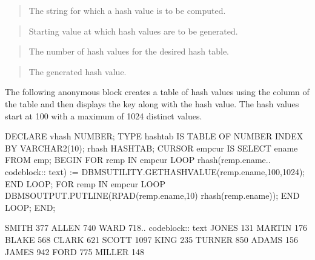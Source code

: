 \documentclass[letterpaper,10pt,english,openany,oneside]{sphinxmanual}
\begin{document}

\begin{quote}

The string for which a hash value is to be computed.
\end{quote}

\begin{quote}

Starting value at which hash values are to be generated.
\end{quote}

\begin{quote}

The number of hash values for the desired hash table.
\end{quote}

\begin{quote}

The generated hash value.
\end{quote}


The following anonymous block creates a table of hash values using the
 column of the  table and then displays the key along with the
hash value. The hash values start at 100 with a maximum of 1024 distinct
values.

%
\begin{sphinxVerbatim}[commandchars=\\\{\}]
DECLARE
    v\PYGZus{}hash          NUMBER;
    TYPE hash\PYGZus{}tab IS TABLE OF NUMBER INDEX BY VARCHAR2(10);
    r\PYGZus{}hash          HASH\PYGZus{}TAB;
    CURSOR emp\PYGZus{}cur IS SELECT ename FROM emp;
BEGIN
    FOR r\PYGZus{}emp IN emp\PYGZus{}cur LOOP
        r\PYGZus{}hash(r\PYGZus{}emp.ename.. code\PYGZhy{}block:: text) :=
            DBMS\PYGZus{}UTILITY.GET\PYGZus{}HASH\PYGZus{}VALUE(r\PYGZus{}emp.ename,100,1024);
    END LOOP;
    FOR r\PYGZus{}emp IN emp\PYGZus{}cur LOOP
        DBMS\PYGZus{}OUTPUT.PUT\PYGZus{}LINE(RPAD(r\PYGZus{}emp.ename,10) \textbar{}\textbar{} \PYGZsq{} \PYGZsq{} \textbar{}\textbar{}
            r\PYGZus{}hash(r\PYGZus{}emp.ename));
    END LOOP;
END;

SMITH      377
ALLEN      740
WARD       718.. code\PYGZhy{}block:: text
JONES      131
MARTIN     176
BLAKE      568
CLARK      621
SCOTT      1097
KING       235
TURNER     850
ADAMS      156
JAMES      942
FORD       775
MILLER     148
\end{sphinxVerbatim}
\end{document}
